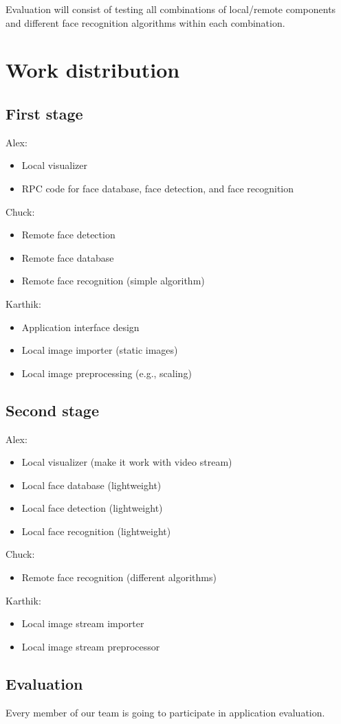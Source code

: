 \documentclass[conference]{IEEEtran}
\begin{document}
Evaluation will consist of testing all combinations of local/remote components and different face recognition algorithms within each combination.

\section{Work distribution}

\subsection{First stage}

Alex:
\begin{itemize}
	\item Local visualizer
	\item RPC code for face database, face detection, and face recognition
\end{itemize}

Chuck:
\begin{itemize}
	\item Remote face detection
	\item Remote face database
	\item Remote face recognition (simple algorithm)
\end{itemize}

Karthik:
\begin{itemize}
	\item Application interface design
	\item Local image importer (static images)
	\item Local image preprocessing (e.g., scaling)
\end{itemize}

\subsection{Second stage}

Alex:
\begin{itemize}
	\item Local visualizer (make it work with video stream)
	\item Local face database (lightweight)
	\item Local face detection (lightweight)
	\item Local face recognition (lightweight)
\end{itemize}

Chuck:
\begin{itemize}
	\item Remote face recognition (different algorithms)
\end{itemize}

Karthik:
\begin{itemize}
	\item Local image stream importer
	\item Local image stream preprocessor
\end{itemize}

\subsection{Evaluation}

Every member of our team is going to participate in application evaluation.




\end{document}
